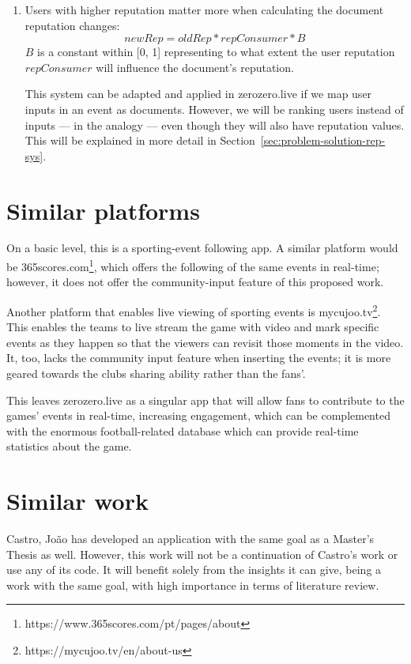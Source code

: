 \begin{enumerate}
    \item Users with higher reputation matter more when calculating the document reputation changes:
    \begin{equation}
        newRep = oldRep * repConsumer * B
    \end{equation}
    $B$ is a constant within [0, 1] representing to what extent the user reputation $repConsumer$ will influence the document's reputation.

    This system can be adapted and applied in zerozero.live if we map user inputs in an event as documents. However, we will be ranking users instead of inputs ---  in the analogy --- even though they will also have reputation values. This will be explained in more detail in Section~\ref{sec:problem-solution-rep-sys}.
    
\end{enumerate} 

\section{Similar platforms}

On a basic level, this is a sporting-event following app. A similar platform would be 365scores.com\footnote{https://www.365scores.com/pt/pages/about}, which offers the following of the same events in real-time; however, it does not offer the community-input feature of this proposed work.

Another platform that enables live viewing of sporting events is mycujoo.tv\footnote{https://mycujoo.tv/en/about-us}. This enables the teams to live stream the game with video and mark specific events as they happen so that the viewers can revisit those moments in the video. It, too, lacks the community input feature when inserting the events; it is more geared towards the clubs sharing ability rather than the fans'. 

This leaves zerozero.live as a singular app that will allow fans to contribute to the games' events in real-time, increasing engagement, which can be complemented with the enormous football-related database which can provide real-time statistics about the game.

\section{Similar work}

Castro, João \cite{PedroSousaCastro2020} has developed an application with the same goal as a Master's Thesis as well. However, this work will not be a continuation of Castro's work or use any of its code. It will benefit solely from the insights it can give, being a work with the same goal, with high importance in terms of literature review.

